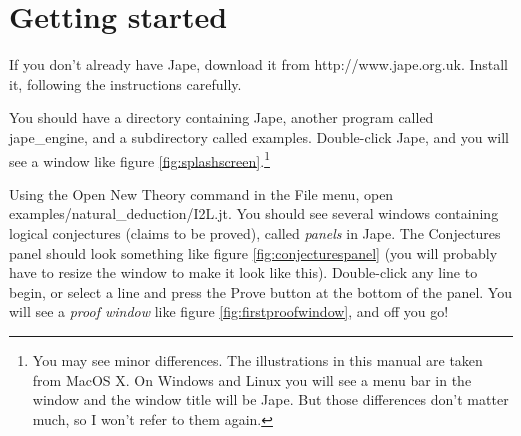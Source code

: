 \documentclass[11pt]{book}
\newcommand{\figref}[1]{figure \ref{fig:#1}}
\begin{document}
\section{Getting started}

If you don't already have Jape, download it from http://www.jape.org.uk. Install it, following the instructions carefully.

You should have a directory containing Jape, another program called jape\_engine, and a subdirectory called examples. Double-click Jape, and you will see a window like \figref{splashscreen}.\footnote{You may see minor differences. The illustrations in this manual are taken from MacOS X. On Windows and Linux you will see a menu bar in the window and the window title will be Jape. But those differences don't matter much, so I won't refer to them again.}

Using the Open New Theory command in  the File menu, open examples/natural\_deduction/I2L.jt. You should see several windows containing logical conjectures (claims to be proved), called \emph{panels} in Jape. The Conjectures panel should look something like \figref{conjecturespanel} (you will probably have to resize the window to make it look like this). Double-click any line to begin, or select a line and press the Prove button at the bottom of the panel. You will see a \emph{proof window} like \figref{firstproofwindow}, and off you go!
\end{document}
